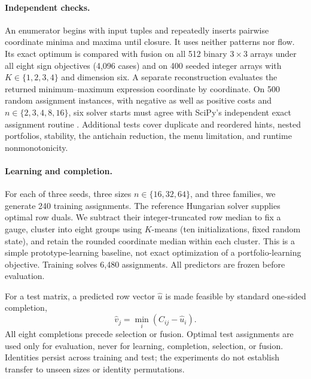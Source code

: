 \documentclass[10pt,letterpaper]{article}
\begin{document}
\paragraph{Independent checks.}
An enumerator begins with input tuples and repeatedly inserts pairwise coordinate minima and maxima until closure. It uses neither patterns nor flow. Its exact optimum is compared with fusion on all 512 binary $3\times3$ arrays under all eight sign objectives (4,096 cases) and on 400 seeded integer arrays with $K\in\{1,2,3,4\}$ and dimension six. A separate reconstruction evaluates the returned minimum--maximum expression coordinate by coordinate. On 500 random assignment instances, with negative as well as positive costs and $n\in\{2,3,4,8,16\}$, six solver starts must agree with SciPy's independent exact assignment routine \citep{scipy}. Additional tests cover duplicate and reordered hints, nested portfolios, stability, the antichain reduction, the menu limitation, and runtime nonmonotonicity.

\paragraph{Learning and completion.}
For each of three seeds, three sizes $n\in\{16,32,64\}$, and three families, we generate 240 training assignments. The reference Hungarian solver supplies optimal row duals. We subtract their integer-truncated row median to fix a gauge, cluster into eight groups using $K$-means (ten initializations, fixed random state), and retain the rounded coordinate median within each cluster. This is a simple prototype-learning baseline, not exact optimization of a portfolio-learning objective. Training solves 6,480 assignments. All predictors are frozen before evaluation.

For a test matrix, a predicted row vector $\widehat u$ is made feasible by standard one-sided completion,
\begin{equation}
 \widehat v_j=\min_i(C_{ij}-\widehat u_i).
 \label{eq:repair}
\end{equation}
All eight completions precede selection or fusion. Optimal test assignments are used only for evaluation, never for learning, completion, selection, or fusion. Identities persist across training and test; the experiments do not establish transfer to unseen sizes or identity permutations.
\end{document}
